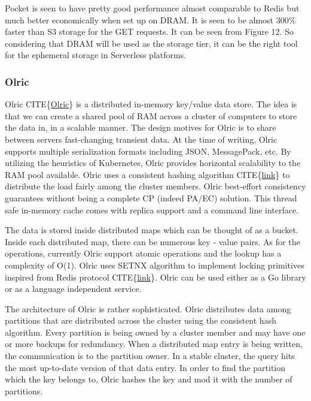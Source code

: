 \documentclass[12pt,titlepage]{article}
\begin{document}
Pocket is seen to have pretty good performance almost comparable to Redis but
much better economically when set up on DRAM. It is seen to be almost 300\%
faster than S3 storage for the GET requests. It can be seen from Figure 12.
So considering that DRAM will be used as the storage tier, it can be the
right tool for the ephemeral storage in Serverless platforms. 

\subsubsection{Olric}
\label{sec:orgfeaa07c}
Olric CITE\{\href{https://github.com/buraksezer/olric}{Olric}\} is a distributed in-memory key/value data store. The idea is
that we can create a shared pool of RAM across a cluster of computers to store
the data in, in a scalable manner. The design motives for Olric is to share
between servers fast-changing transient data. At the time of writing, Olric
supports multiple serialization formats including JSON, MessagePack, etc. By
utilizing the heuristics of Kubernetes, Olric provides horizontal scalability to
the RAM pool available. Olric uses a consistent hashing algorithm CITE\{\href{https://github.com/buraksezer/consistent}{link}\} to distribute
the load fairly among the cluster members. Olric best-effort consistency
guarantees without being a complete CP (indeed PA/EC) solution. This thread safe
in-memory cache comes with replica support and a command line interface.

The data is stored inside distributed maps which can be thought of as a bucket.
Inside each distributed map, there can be numerous key - value pairs. As for the
operations, currently Olric support atomic operations and the lookup
has a complexity of O(1). Olric uses SETNX algorithm to implement locking
primitives inspired from Redis protocol CITE\{\href{https://redis.io/commands/setnx\#design-pattern-locking-with-codesetnxcode}{link}\}. Olric can be used either as a
Go library or as a language independent service.

The architecture of Olric is rather sophisticated. Olric distributes data among
partitions that are distributed across the cluster using the consistent hash algorithm. Every partition is being
owned by a cluster member and may have one or more backups for redundancy. When
a distributed map entry is being written, the communication is to the partition
owner. In a stable cluster, the query hits the most up-to-date version of that
data entry. In order to find the partition which the key belongs to, Olric
hashes the key and mod it with the number of partitions.
\end{document}
